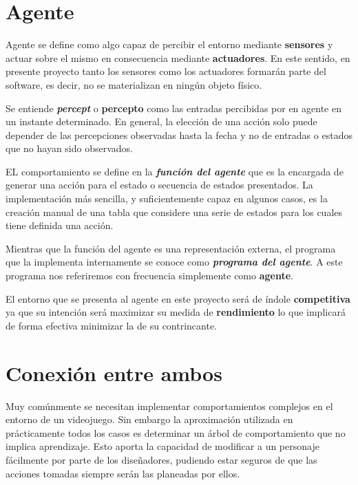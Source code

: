 \section{Agente}

Agente se define como algo capaz de percibir el entorno mediante \textbf{sensores} y actuar sobre el mismo en consecuencia mediante \textbf{actuadores}\cite{modern}. En este sentido, en presente proyecto tanto los sensores como los actuadores formarán parte del software, es decir, no se materializan en ningún objeto físico.

\bigskip

Se entiende \textbf{\textit{percept}} o \textbf{percepto} como las entradas percibidas por en agente en un instante determinado. En general, la elección de una acción solo puede depender de las percepciones observadas hasta la fecha y no de entradas o estados que no hayan sido observados.

\bigskip

EL comportamiento se define en la \textbf{\textit{función del agente}} que es la encargada de generar una acción para el estado o secuencia de estados presentados. La implementación más sencilla, y suficientemente capaz en algunos casos, es la creación manual de una tabla que considere una serie de estados para los cuales tiene definida una acción.

\bigskip

Mientras que la función del agente es una representación externa, el programa que la implementa internamente se conoce como \textbf{\textit{programa del agente}}. A este programa nos referiremos con frecuencia simplemente como \textbf{agente}.

\bigskip

El entorno que se presenta al agente en este proyecto será de índole \textbf{competitiva} ya que su intención será maximizar su medida de \textbf{rendimiento} lo que implicará de forma efectiva minimizar la de su contrincante.

\section{Conexión entre ambos}

Muy comúnmente se necesitan implementar comportamientos complejos en el entorno de un videojuego. Sin embargo la aproximación utilizada en prácticamente todos los casos es determinar un árbol de comportamiento que no implica aprendizaje. Esto aporta la capacidad de modificar a un personaje fácilmente por parte de los diseñadores, pudiendo estar seguros de que las acciones tomadas siempre serán las planeadas por ellos. 

